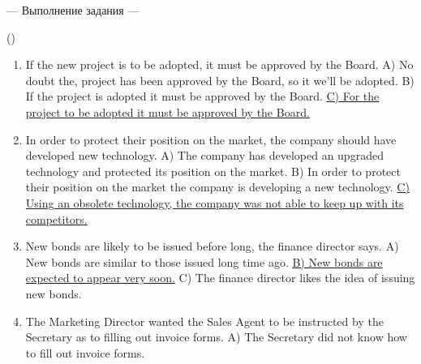 \documentclass[main.tex]{subfiles}
\begin{document}


\newpage
{}

\hypertarget{ltask:2024-04-03-1}{--- Выполнение задания ---} (\hyperref[task:2024-04-03-1]{\color{blue}{перейти к тексту задания}})
\\

\vspace{5pt}
\begin{enumerate}[nosep, leftmargin=*]
	\itemsep15pt
	\item If the new project is to be adopted, it must be approved by the Board.\newline
		A) No doubt the, project has been approved by the Board, so it we'll be adopted.\newline
		B) If the project is adopted it must be approved by the Board.\newline
		\uline{C) For the project to be adopted it must be approved by the Board.}
	\item In order to protect their position on the market, the company should have developed new technology.\newline
		A) The company has developed an upgraded technology and protected its position on the market.\newline
		B) In order to protect their position on the market the company is developing a new technology.\newline
		\uline{C) Using an obsolete technology, the company was not able to keep up with its competitors.}
	\item New bonds are likely to be issued before long, the finance director says.\newline
		A) New bonds are similar to those issued long time ago.\newline
		\uline{B) New bonds are expected to appear very soon.}\newline
		C) The finance director likes the idea of issuing new bonds.
	\item The Marketing Director wanted the Sales Agent to be instructed by the Secretary as to filling out invoice forms.\newline
		A) The Secretary did not know how to fill out invoice forms.\newline

\end{enumerate}
\end{document}
